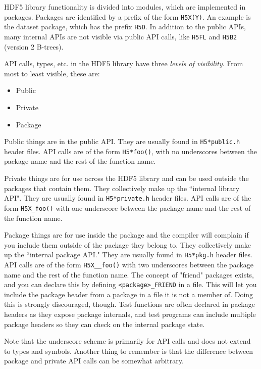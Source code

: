 
HDF5 library functionality is divided into modules, which are implemented in packages. Packages are identified by a prefix of the form \texttt{H5X(Y)}. An example is the dataset package, which has the prefix \texttt{H5D}. In addition to the public APIs, many internal APIs are not visible via public API calls, like \texttt{H5FL} and \texttt{H5B2} (version 2 B-trees).

API calls, types, etc. in the HDF5 library have three \textit{levels of visibility}. From most to least visible, these are:
\begin{itemize}
    \item Public
    \item Private
    \item Package
\end{itemize}

Public things are in the public API. They are usually found in \texttt{H5*public.h} header files. API calls are of the form \texttt{H5*foo()}, with no underscores between the package name and the rest of the function name.

Private things are for use across the HDF5 library and can be used outside the packages that contain them. They collectively make up the ``internal library API". They are usually found in \texttt{H5*private.h} header files. API calls are of the form \texttt{H5X\_foo()} with one underscore between the package name and the rest of the function name.

Package things are for use inside the package and the compiler will complain if you include them outside of the package they belong to. They collectively make up the ``internal package API." They are usually found in \texttt{H5*pkg.h} header files. API calls are of the form \texttt{H5X\_\_foo()} with two underscores between the package name and the rest of the function name. The concept of "friend" packages exists, and you can declare this by defining \texttt{<package>\_FRIEND} in a file. This will let you include the package header from a package in a file it is not a member of. Doing this is strongly discouraged, though. Test functions are often declared in package headers as they expose package internals, and test programs can include multiple package headers so they can check on the internal package state.

Note that the underscore scheme is primarily for API calls and does not extend to types and symbols. Another thing to remember is that the difference between package and private API calls can be somewhat arbitrary. 

